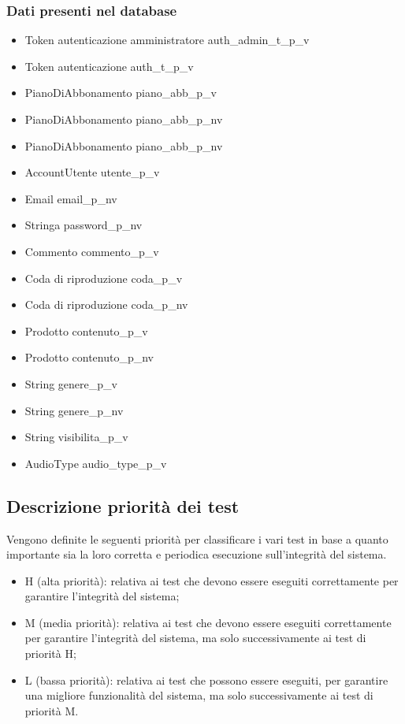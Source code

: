 \subsubsection{Dati presenti nel database}
\begin{itemize}
    \item Token autenticazione amministratore auth\_admin\_t\_p\_v
    \item Token autenticazione auth\_t\_p\_v
    \item PianoDiAbbonamento piano\_abb\_p\_v
    \item PianoDiAbbonamento piano\_abb\_p\_nv
    \item PianoDiAbbonamento piano\_abb\_p\_nv
    \item AccountUtente utente\_p\_v
    \item Email email\_p\_nv
    \item Stringa password\_p\_nv
    \item Commento commento\_p\_v
    \item Coda di riproduzione coda\_p\_v
    \item Coda di riproduzione coda\_p\_nv
    \item Prodotto contenuto\_p\_v
    \item Prodotto contenuto\_p\_nv
    \item String genere\_p\_v
    \item String genere\_p\_nv
    \item String visibilita\_p\_v
    \item AudioType audio\_type\_p\_v

\end{itemize}

\subsection{Descrizione priorità dei test}

Vengono definite le seguenti priorità per classificare i vari test in base a quanto importante sia la
loro corretta e periodica esecuzione sull'integrità del sistema.
\begin{itemize}
    \item H (alta priorità): relativa ai test che devono essere eseguiti correttamente per garantire l'integrità
          del sistema;
    \item M (media priorità): relativa ai test che devono essere eseguiti correttamente per garantire l'integrità
          del sistema, ma solo successivamente ai test di priorità H;
    \item L (bassa priorità): relativa ai test che possono essere eseguiti, per garantire una migliore funzionalità
          del sistema, ma solo successivamente ai test di priorità M.
\end{itemize}


